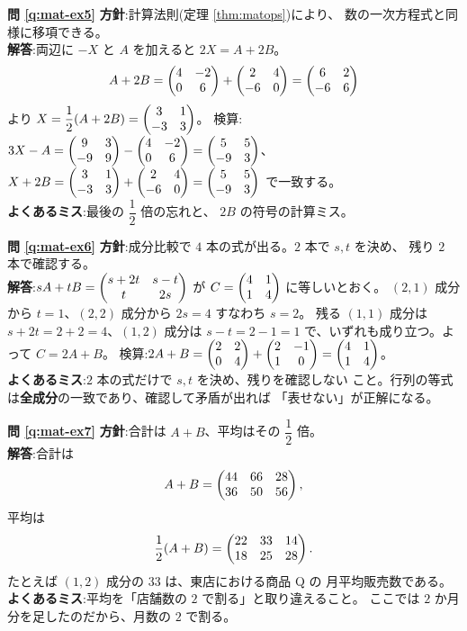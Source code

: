 \bigskip
\noindent\textbf{問 \ref{q:mat-ex5}}\quad
\textbf{方針}:計算法則(定理 \ref{thm:matops})により、
数の一次方程式と同様に移項できる。\\
\textbf{解答}:両辺に $-X$ と $A$ を加えると $2X = A + 2B$。
\[
A + 2B = \begin{pmatrix}4 & -2 \\ 0 & 6\end{pmatrix} + \begin{pmatrix}2 & 4 \\ -6 & 0\end{pmatrix} = \begin{pmatrix}6 & 2 \\ -6 & 6\end{pmatrix}
\]
より $X = \dfrac{1}{2}(A + 2B) = \begin{pmatrix}3 & 1 \\ -3 & 3\end{pmatrix}$。
検算:$3X - A = \begin{pmatrix}9 & 3 \\ -9 & 9\end{pmatrix} - \begin{pmatrix}4 & -2 \\ 0 & 6\end{pmatrix}
= \begin{pmatrix}5 & 5 \\ -9 & 3\end{pmatrix}$、
$X + 2B = \begin{pmatrix}3 & 1 \\ -3 & 3\end{pmatrix} + \begin{pmatrix}2 & 4 \\ -6 & 0\end{pmatrix}
= \begin{pmatrix}5 & 5 \\ -9 & 3\end{pmatrix}$ で一致する。\\
\textbf{よくあるミス}:最後の $\dfrac{1}{2}$ 倍の忘れと、
$2B$ の符号の計算ミス。

\bigskip
\noindent\textbf{問 \ref{q:mat-ex6}}\quad
\textbf{方針}:成分比較で $4$ 本の式が出る。$2$ 本で $s, t$ を決め、
残り $2$ 本で確認する。\\
\textbf{解答}:$sA + tB = \begin{pmatrix}s + 2t & s - t \\ t & 2s\end{pmatrix}$ が
$C = \begin{pmatrix}4 & 1 \\ 1 & 4\end{pmatrix}$ に等しいとおく。
$(2,1)$ 成分から $t = 1$、$(2,2)$ 成分から $2s = 4$ すなわち $s = 2$。
残る $(1,1)$ 成分は $s + 2t = 2 + 2 = 4$、$(1,2)$ 成分は
$s - t = 2 - 1 = 1$ で、いずれも成り立つ。よって $C = 2A + B$。
検算:$2A + B = \begin{pmatrix}2 & 2 \\ 0 & 4\end{pmatrix} + \begin{pmatrix}2 & -1 \\ 1 & 0\end{pmatrix}
= \begin{pmatrix}4 & 1 \\ 1 & 4\end{pmatrix}$。\\
\textbf{よくあるミス}:$2$ 本の式だけで $s, t$ を決め、残りを確認しない
こと。行列の等式は\textbf{全成分}の一致であり、確認して矛盾が出れば
「表せない」が正解になる。

\bigskip
\noindent\textbf{問 \ref{q:mat-ex7}}\quad
\textbf{方針}:合計は $A + B$、平均はその $\dfrac{1}{2}$ 倍。\\
\textbf{解答}:合計は
\[
A + B = \begin{pmatrix}44 & 66 & 28 \\ 36 & 50 & 56\end{pmatrix},
\]
平均は
\[
\frac{1}{2}(A + B) = \begin{pmatrix}22 & 33 & 14 \\ 18 & 25 & 28\end{pmatrix}.
\]
たとえば $(1,2)$ 成分の $33$ は、東店における商品 Q の
月平均販売数である。\\
\textbf{よくあるミス}:平均を「店舗数の $2$ で割る」と取り違えること。
ここでは $2$ か月分を足したのだから、月数の $2$ で割る。

